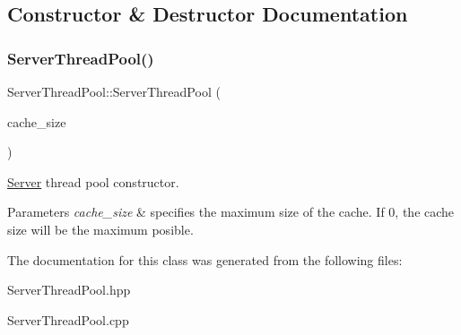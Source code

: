 \subsection{Constructor \& Destructor Documentation}
\mbox{\label{classServerThreadPool_a2da6753b0170d337851425975763bbf9}} 
\subsubsection{\texorpdfstring{Server\+Thread\+Pool()}{ServerThreadPool()}}
{\footnotesize\ttfamily Server\+Thread\+Pool\+::\+Server\+Thread\+Pool (\begin{DoxyParamCaption}\item[{std\+::size\+\_\+t}]{cache\+\_\+size }\end{DoxyParamCaption})}



\hyperlink{classServer}{Server} thread pool constructor. 


\begin{DoxyParams}{Parameters}
{\em cache\+\_\+size} & specifies the maximum size of the cache. If 0, the cache size will be the maximum posible. \\
\hline
\end{DoxyParams}


The documentation for this class was generated from the following files\+:\begin{DoxyCompactItemize}
\item 
Server\+Thread\+Pool.\+hpp\item 
Server\+Thread\+Pool.\+cpp\end{DoxyCompactItemize}
